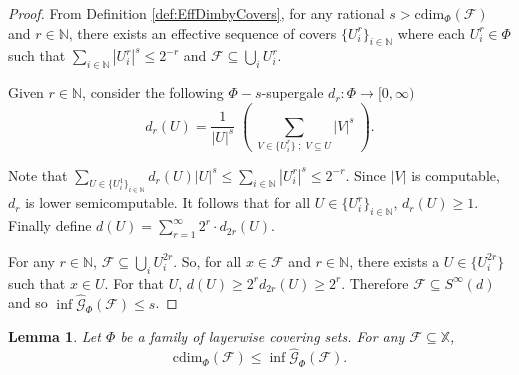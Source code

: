 \documentclass[11pt]{article}
\newtheorem{lemma}{Lemma}
\newcommand{\N}{\mathbb{N}}
\newcommand{\cdim}{\mathrm{cdim}}
\newcommand{\F}{{\mathcal{F}}}
\newcommand{\X}{{\mathbb{X}}}
\newcommand{\Rplus}{[0,\infty)}
\renewcommand{\F}{\mathcal{F}}
\newcommand{\U}{U}
\begin{document}
\begin{proof} 
	
	From Definition \ref{def:EffDimbyCovers},  for any rational $s > \cdim_\Phi(\mathcal{F})$ and $r \in \N$, there exists an effective sequence of covers $\{\U_i^r\}_{i \in \N}$ where each $\U_i^r \in \Phi$ such that $\sum_{i \in \N}|\U_i^r|^s \leq 2^{-r}$ and $\F \subseteq \bigcup_i \U_i^r$.
	
    Given $r \in \N$, consider the following $\Phi-$$s$-supergale $d_r : 
	\Phi \to \Rplus$  
	$$d_r(\U) = \frac{1}{|\U|^s} \;\left(\; { \sum_{{V} \in \{\U_i^r\} \; ; \; {V} \subseteq \U } |{V}|^s} \;\right).$$
	
	
	Note that $\sum\limits_{U \in \{U_i^1\}_{i \in \N}} d_r(U) |U|^s \leq  \sum_{i\in \N} |U_i^r|^s \leq 2^{-r}$. Since $|{V}|$ is computable, $d_r$ is lower semicomputable. It follows that for all $\U \in \{\U_i^r\}_{i\in \N}$, $d_r(\U) \geq 1$.  Finally define $d(\U) = \sum_{r=1}^{\infty}2^r \cdot d_{2r}(\U).$
	
	For any $r\in \N$, $\F \subseteq \bigcup_i \U_i^{2r}$. So, for all $x \in \F$ and  $r \in \N$, there exists a $\U \in \{\U_i^{2r}\}$ such that $x \in \U$. For that $\U$,  $d(\U) \geq 2^r d_{2r}(\U) \geq 2^r$. Therefore $\F \subseteq S^\infty(d)$ and so $\inf
	\hat{\mathcal{G}}_{\Phi}(\mathcal{F}) \leq s$.
\end{proof}

\begin{lemma} \label{lem:CdimPhiGales2}
	Let $\Phi$ be a family of layerwise covering sets. For any  $\mathcal{F}
	\subseteq \X$, $$\cdim_{\Phi}(\mathcal{F}) \leq \inf
	\hat{\mathcal{G}}_{\Phi}(\mathcal{F}).$$
\end{lemma}
\end{document}
